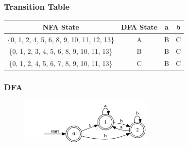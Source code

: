 \documentclass[paper=a4, fontsize=11pt]{scrartcl} %
\numberwithin{equation}{section} %
\numberwithin{figure}{section} %
\numberwithin{table}{section} %
\begin{document}
\subsubsection*{Transition Table}
\begin{table}[H]
\centering
\begin{tabular}{|c|c|c|c|}
\hline
NFA State & DFA State & a & b \\
\hline
\{0, 1, 2, 4, 5, 6, 8, 9, 10, 11, 12, 13\} & A & B & C \\
\hline
\{0, 1, 2, 3, 4, 5, 6, 8, 9, 10, 11, 13\} & B & B & C \\
\hline
\{0, 1, 2, 4, 5, 6, 7, 8, 9, 10, 11, 13\} & C & B & C \\
\hline
\end{tabular}
\end{table}
\subsubsection*{DFA}
\begin{figure}[H]
\centering
\includegraphics[width=0.6\textwidth]{3_3_2.png}
\label{fig:3_3_2}
\end{figure}
\end{document}
